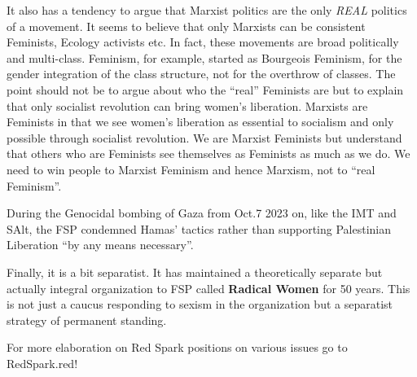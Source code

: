It also has a tendency to argue that Marxist politics are the only \emph{REAL} politics of a movement. It seems to believe that only Marxists can be consistent Feminists, Ecology activists etc. In fact, these movements are broad politically and multi-class. Feminism, for example, started as Bourgeois Feminism, for the gender integration of the class structure, not for the overthrow of classes. The point should not be to argue about who the ``real'' Feminists are but to explain that only socialist revolution can bring women's liberation. Marxists are Feminists in that we see women's liberation as essential to socialism and only possible through socialist revolution. We are Marxist Feminists but understand that others who are Feminists see themselves as Feminists as much as we do. We need to win people to Marxist Feminism and hence Marxism, not to ``real Feminism''.

During the Genocidal bombing of Gaza from Oct.7 2023 on, like the IMT and SAlt, the FSP condemned Hamas' tactics rather than supporting Palestinian Liberation ``by any means necessary''.

Finally, it is a bit separatist. It has maintained a theoretically separate but actually integral organization to FSP called \textbf{Radical Women} for 50 years. This is not just a caucus responding to sexism in the organization but a separatist strategy of permanent standing.

For more elaboration on Red Spark positions on various issues go to RedSpark.red!
